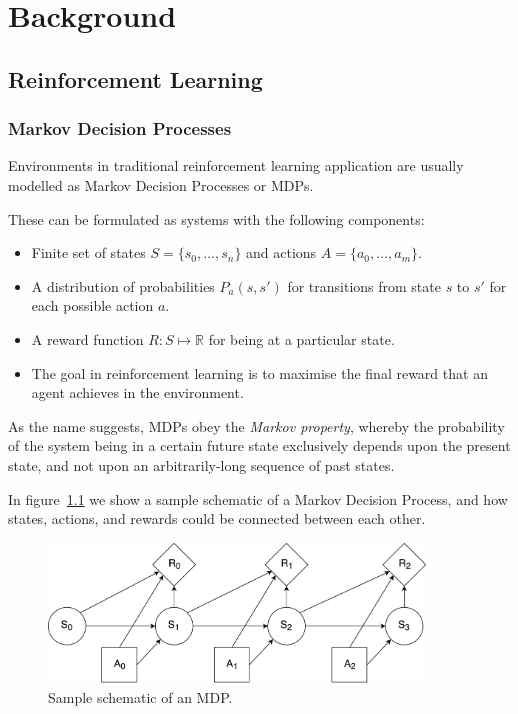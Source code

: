 
\chapter{Background} %

\label{Chapter2} %



\section{Reinforcement Learning}
\label{RL}

\subsection{Markov Decision Processes}
\label{MDP}
Environments in traditional reinforcement learning application are usually modelled as Markov Decision Processes or MDPs.

These can be formulated as systems with the following components:
\begin{itemize}
	\item Finite set of states $S=\{s_0,\ldots,s_n\}$ and actions $A=\{a_0,\ldots,a_m\}$.
	\item A distribution of probabilities $P_a(s,s')$ for transitions from state $s$ to $s'$ for each possible action $a$.
	\item A reward function $R:S\mapsto\mathbb{R}$ for being at a particular state.
	\item The goal in reinforcement learning is to maximise the final reward that an agent achieves in the environment.
\end{itemize}

As the name suggests, MDPs obey the \textit{Markov property}, whereby the probability of the system being in a certain future state exclusively depends upon the present state, and not upon an arbitrarily-long sequence of past states.

In figure~\ref{fig:MDP} we show a sample schematic of a Markov Decision Process, and how states, actions, and rewards could be connected between each other.

\begin{figure}
\centering
\includegraphics[width=10cm]{Figures/MDP}
\caption{Sample schematic of an MDP.}
\label{fig:MDP}
\end{figure}


